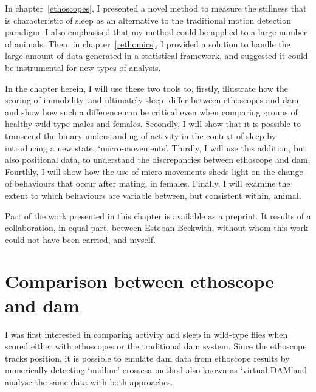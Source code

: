 In chapter~\ref{ethoscopes}, I presented a novel method to measure the stillness that is characteristic of sleep as an alternative to the traditional motion detection paradigm. I also emphasised that my method could be applied to a large number of animals.
Then, in chapter~\ref{rethomics}, I provided a solution to handle the large amount of data generated in a statistical framework, and suggested it could be instrumental for new types of analysis.

In the chapter herein, I will use these two tools to, firstly, illustrate how the scoring of immobility, and ultimately sleep, differ between ethoscopes and \gls{dam} and show how such a difference can be critical even when comparing groups of healthy wild-type males and females. 
Secondly, I will show that it is possible to transcend the binary understanding of activity in the context of sleep by introducing a new state: `micro-movements'. 
Thirdly, I will use this addition, but also positional data, to understand the discrepancies between ethoscope and \gls{dam}.
Fourthly, I will show how the use of micro-movements sheds light on the change of behaviours that occur after mating, in females.
Finally, I will examine the extent to which behaviours are variable between, but consistent within, animal.


Part of the work presented in this chapter is available as a preprint\cite{geissmann_most_2018}. It results of a collaboration, in equal part, between Esteban Beckwith, without whom this work could not have been carried, and myself.

\section{Comparison between ethoscope and \gls{dam}}

I was first interested in comparing activity and sleep in wild-type flies when scored either with ethoscopes or the traditional \gls{dam} system.
Since the ethoscope tracks position, it is possible to emulate \gls{dam} data from ethoscope results by numerically detecting `midline' crosses\emd{}a method also known as `virtual DAM'\cite{gilestro_video_2012}\emd{}and analyse the same data with both approaches.

